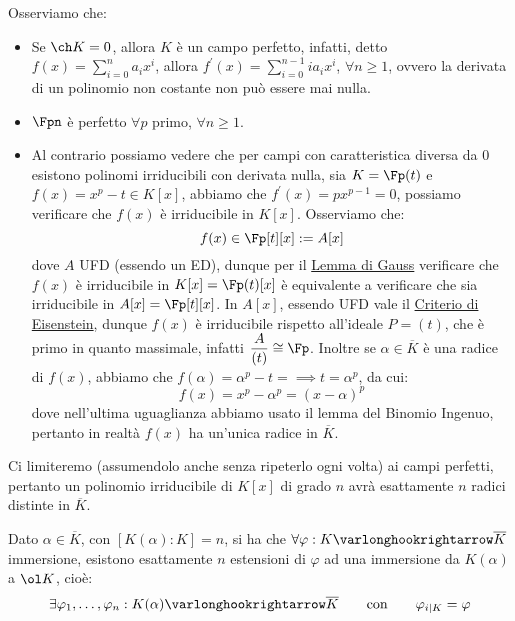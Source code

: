 \documentclass[11pt]{scrartcl}
\begin{document}
\begin{remark}
    Osserviamo che:
    \begin{itemize}
        \item Se $\ch K = 0$, allora $K$ è un campo perfetto, infatti, detto $f(x) = \sum_{i=0}^n a_ix^i$, allora $f^{\prime}(x) = \sum_{i=0}^{n-1} ia_ix^i$, $\forall n \geq 1$, ovvero la derivata di un polinomio non 
        costante non può essere mai nulla.
        \item $\Fpn$ è perfetto $\forall p$ primo, $\forall n \geq 1$.
        \item Al contrario possiamo vedere che per campi con caratteristica diversa da 0 esistono polinomi irriducibili con derivata nulla, sia $K = \Fp(t)$ e $f(x) = x^p - t \in K[x]$, abbiamo che $f^{\prime}(x) = px^{p-1} = 0$,
        possiamo verificare che $f(x)$ è irriducibile in $K[x]$. Osserviamo che:
        \[ f(x) \in \Fp[t][x] := A[x]
            \]
        dove $A$ UFD (essendo un ED), dunque per il \hyperref[gauss]{Lemma di Gauss} verificare che $f(x)$ è irriducibile in $K[x] = \Fp(t)[x]$ è equivalente a verificare che sia irriducibile in $A[x] = \Fp[t][x]$.
        In $A[x]$, essendo UFD vale il \hyperref[eisenstein]{Criterio di Eisenstein}, dunque $f(x)$ è irriducibile rispetto all'ideale $P = (t)$, che è primo in quanto massimale, infatti $\displaystyle\frac{A}{(t)} \cong \Fp$.
        Inoltre se $\alpha \in \overline K$ è una radice di $f(x)$, abbiamo che $f(\alpha) = \alpha^p - t = \implies t = \alpha^p$, da cui:
        \[ f(x) = x^p - \alpha^p = (x - \alpha)^p
            \]
        dove nell'ultima uguaglianza abbiamo usato il lemma del Binomio Ingenuo, pertanto in realtà $f(x)$ ha un'unica radice in $\overline K$.
    \end{itemize}
\end{remark}

Ci limiteremo (assumendolo anche senza ripeterlo ogni volta) ai campi perfetti, pertanto un polinomio irriducibile di $K[x]$ di grado $n$ avrà esattamente $n$ radici distinte in $\overline K$.

\begin{proposition}
    \label{3.37}
    Dato $\alpha \in \overline K$, con $[K(\alpha) : K] = n$, si ha che $\forall \varphi : K \varlonghookrightarrow \overline K$ immersione, esistono esattamente $n$ estensioni di $\varphi$ ad una immersione da $K(\alpha)$ a $\ol K$, cioè:
    \[ \exists \varphi_1,\ldots,\varphi_n : K(\alpha) \varlonghookrightarrow \overline K \qquad \text{con} \qquad \varphi_{i|K} = \varphi
        \]
\end{proposition}
\end{document}
